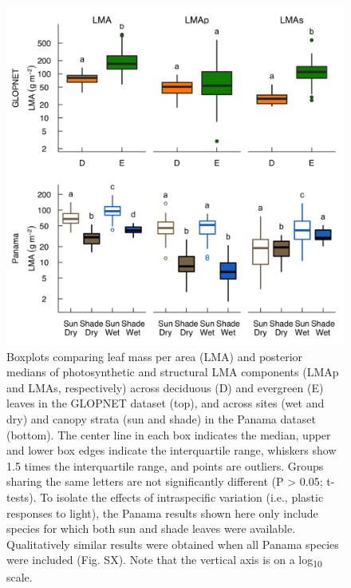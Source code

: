 \documentclass[
  12pt,
]{article}
\begin{document}
\newpage

\begin{figure}
\hypertarget{fig:boxplt}{%
\centering
\includegraphics{../figs/box_main.png}
\caption{Boxplots comparing leaf mass per area (LMA) and posterior medians of photosynthetic and structural LMA components (LMAp and LMAs, respectively) across deciduous (D) and evergreen (E) leaves in the GLOPNET dataset (top), and across sites (wet and dry) and canopy strata (sun and shade) in the Panama dataset (bottom).
The center line in each box indicates the median, upper and lower box edges indicate the interquartile range, whiskers show 1.5 times the interquartile range, and points are outliers.
Groups sharing the same letters are not significantly different (P \textgreater{} 0.05; t-tests).
To isolate the effects of intraspecific variation (i.e., plastic responses to light), the Panama results shown here only include species for which both sun and shade leaves were available.
Qualitatively similar results were obtained when all Panama species were included (Fig. SX).
Note that the vertical axis is on a log\textsubscript{10} scale.}\label{fig:boxplt}
}
\end{figure}

\newpage
\end{document}
